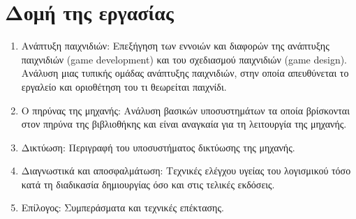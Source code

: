 \section{Δομή της εργασίας}
\begin{enumerate}
	\item{Ανάπτυξη παιχνιδιών}: Επεξήγηση των εννοιών και διαφορών της ανάπτυξης παιχνιδιών (game development) και του σχεδιασμού παιχνιδιών (game design). Ανάλυση μιας τυπικής ομάδας ανάπτυξης παιχνιδιών, στην οποία απευθύνεται το εργαλείο και οριοθέτηση του τι θεωρείται παιχνίδι.
	\item{Ο πηρύνας της μηχανής}: Ανάλυση βασικών υποσυστημάτων τα οποία βρίσκονται στον πηρύνα της βιβλιοθήκης και είναι αναγκαία για τη λειτουργία της μηχανής.
	\item{Δικτύωση}: Περιγραφή του υποσυστήματος δικτύωσης της μηχανής.
	\item{Διαγνωστικά και αποσφαλμάτωση}: Τεχνικές ελέγχου υγείας του λογισμικού τόσο κατά τη διαδικασία δημιουργίας όσο και στις τελικές εκδόσεις.
	\item{Επίλογος}: Συμπεράσματα και τεχνικές επέκτασης.
\end{enumerate}
